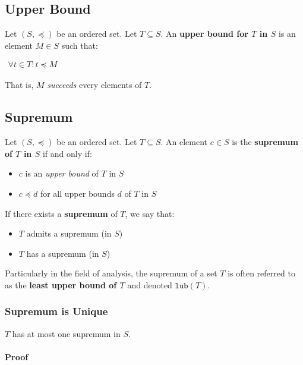 \subsection{Upper Bound}
\label{sec:upper-bound}

Let $(S, \preceq)$ be an ordered set. Let $T \subseteq S$. An
\textbf{upper bound for $T$ in $S$} is an element $M \in S$ such that:

\begin{math}
  \begin{array}{c}
    \forall t \in T : t \preceq M
  \end{array}
\end{math}

That is, $M$ \textit{succeeds} every elements of $T$.



\subsection{Supremum}
\label{sec:supremum}

Let $(S, \preceq)$ be an ordered set. Let $T \subseteq S$. An element
$c \in S$ is the \textbf{supremum of $T$ in $S$} if and only if:

\begin{itemize}
\item $c$ is an \textit{upper bound} of $T$ in $S$
\item $c \preceq d$ for all upper bounds $d$ of $T$ in $S$
\end{itemize}

If there exists a \textbf{supremum} of $T$, we say that:

\begin{itemize}
\item $T$ admits a supremum (in $S$)
\item $T$ has a supremum (in $S$)
\end{itemize}


Particularly in the field of analysis, the supremum of a set $T$ is
often referred to as the \textbf{least upper bound of $T$} and denoted
$\mathtt{lub}(T)$.


\subsubsection{Supremum is Unique}

$T$ has at most one supremum in $S$.

\paragraph{Proof}

